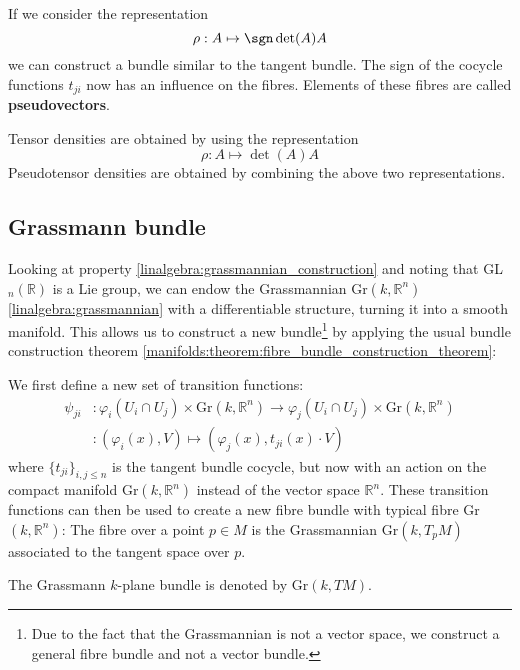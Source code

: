 	\begin{example}[Pseudovectors]
		If we consider the representation
		\begin{equation}
			\rho:A\mapsto \sgn\det(A)A
		\end{equation}
		we can construct a bundle similar to the tangent bundle. The sign of the cocycle functions $t_{ji}$ now has an influence on the fibres. Elements of these fibres are called \textbf{pseudovectors}.
	\end{example}
	\begin{example}
		Tensor densities are obtained by using the representation
		\begin{equation}
			\rho:A\mapsto \det(A)A
		\end{equation}
		Pseudotensor densities are obtained by combining the above two representations.
	\end{example}
	
\subsection{Grassmann bundle}

	Looking at property \ref{linalgebra:grassmannian_construction} and noting that GL$_n(\mathbb{R})$ is a Lie group, we can endow the Grassmannian Gr$(k, \mathbb{R}^n)$ \ref{linalgebra:grassmannian} with a differentiable structure, turning it into a smooth manifold. This allows us to construct a new bundle\footnote{Due to the fact that the Grassmannian is not a vector space, we construct a general fibre bundle and not a vector bundle.} by applying the usual bundle construction theorem \ref{manifolds:theorem:fibre_bundle_construction_theorem}:
	
	\begin{construct}\label{manifolds:grassmann_bundle}
		We first define a new set of transition functions:
		\begin{align}
			\psi_{ji}&:\varphi_i(U_i\cap U_j)\times \text{Gr}(k, \mathbb{R}^n) \rightarrow \varphi_j(U_i\cap U_j)\times \text{Gr}(k, \mathbb{R}^n)\nonumber\\
			&:(\varphi_i(x), V)\mapsto(\varphi_j(x), t_{ji}(x)\cdot V)
		\end{align}
		where $\{t_{ji}\}_{i, j\leq n}$ is the tangent bundle cocycle, but now with an action on the compact manifold Gr$(k, \mathbb{R}^n)$ instead of the vector space $\mathbb{R}^n$. These transition functions can then be used to create a new fibre bundle with typical fibre Gr$(k, \mathbb{R}^n)$: The fibre over a point $p\in M$ is the Grassmannian Gr$(k, T_pM)$ associated to the tangent space over $p$.
	\end{construct}
	\begin{notation}
		The Grassmann $k$-plane bundle is denoted by Gr$(k, TM)$.
	\end{notation}
	
